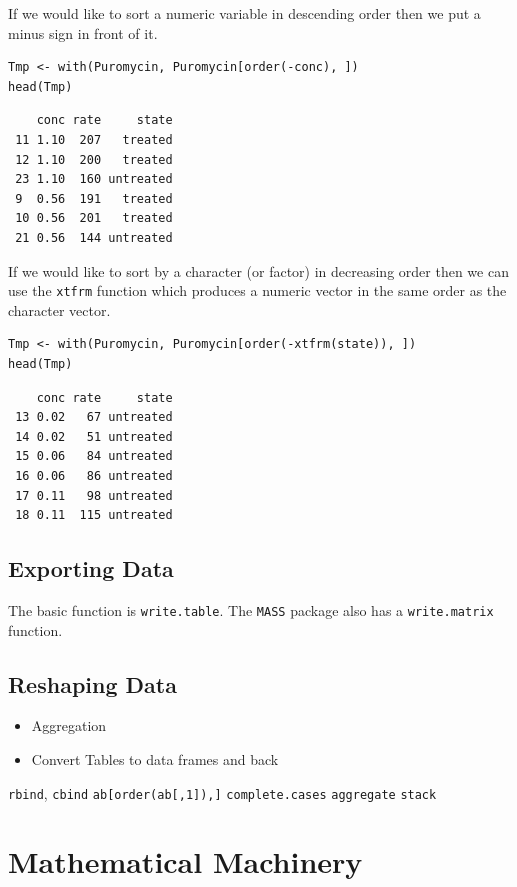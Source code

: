 \documentclass[captions=tableheading]{scrbook}
\begin{document}
\begin{example}
If we would like to sort a numeric variable in descending order then we put a minus sign in front of it. 


\lstset{language=R}
\begin{lstlisting}
Tmp <- with(Puromycin, Puromycin[order(-conc), ])
head(Tmp)
\end{lstlisting}

\begin{verbatim}
    conc rate     state
 11 1.10  207   treated
 12 1.10  200   treated
 23 1.10  160 untreated
 9  0.56  191   treated
 10 0.56  201   treated
 21 0.56  144 untreated
\end{verbatim}

If we would like to sort by a character (or factor) in decreasing order then we can use the \texttt{xtfrm} function which produces a numeric vector in the same order as the character vector.


\lstset{language=R}
\begin{lstlisting}
Tmp <- with(Puromycin, Puromycin[order(-xtfrm(state)), ])
head(Tmp)
\end{lstlisting}

\begin{verbatim}
    conc rate     state
 13 0.02   67 untreated
 14 0.02   51 untreated
 15 0.06   84 untreated
 16 0.06   86 untreated
 17 0.11   98 untreated
 18 0.11  115 untreated
\end{verbatim}
\section{Exporting Data}
\label{sec-20-5}
\label{sec-Exporting-a-Data}


The basic function is \texttt{write.table}. The \texttt{MASS} package also has a \texttt{write.matrix} function.
\section{Reshaping Data}
\label{sec-20-6}
\label{sec-Reshaping-a-Data}


\begin{itemize}
\item Aggregation
\item Convert Tables to data frames and back
\end{itemize}

\texttt{rbind}, \texttt{cbind}
\texttt{ab[order(ab[,1]),]}
\texttt{complete.cases}
\texttt{aggregate}
\texttt{stack}
\chapter{Mathematical Machinery}
\label{sec-21}
\label{cha-Mathematical-Machinery}



\end{example}
\end{document}
